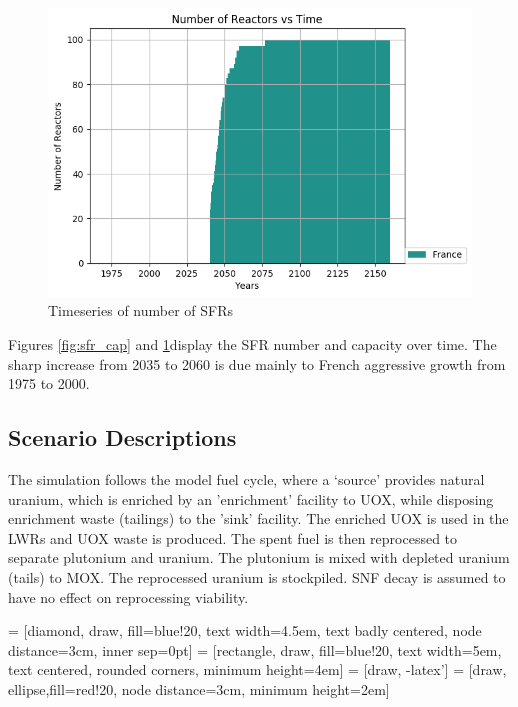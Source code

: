 \begin{figure}[htbp!]
	\begin{center}
		\includegraphics[scale=0.7]{./images/french-transition/number_plot.png}
	\end{center}
	\caption{Timeseries of number of \gls{SFR}s}
	\label{fig:sfr_num}
\end{figure}


Figures \ref{fig:sfr_cap} and \ref{fig:sfr_num}display
the \gls{SFR} number and capacity over time.
The sharp increase from 2035 to 2060 is due mainly to
French aggressive growth from 1975 to 2000.

\subsection{Scenario Descriptions}
The simulation follows the model fuel cycle, where a `source'
provides natural uranium, which is enriched by an 'enrichment'
facility to \gls{UOX}, while disposing enrichment waste (tailings)
to the 'sink' facility. The enriched \gls{UOX} is used
in the \gls{LWR}s and \gls{UOX} waste is produced. The spent fuel
is then reprocessed to separate plutonium and uranium.
The plutonium is mixed with depleted uranium (tails) to \gls{MOX}.
The reprocessed uranium is stockpiled. \gls{SNF} decay is assumed
to have no effect on reprocessing viability.


 = [diamond, draw, fill=blue!20, 
text width=4.5em, text badly centered, node distance=3cm, inner sep=0pt]
 = [rectangle, draw, fill=blue!20, 
text width=5em, text centered, rounded corners, minimum height=4em]
 = [draw, -latex']
 = [draw, ellipse,fill=red!20, node distance=3cm,
minimum height=2em]


